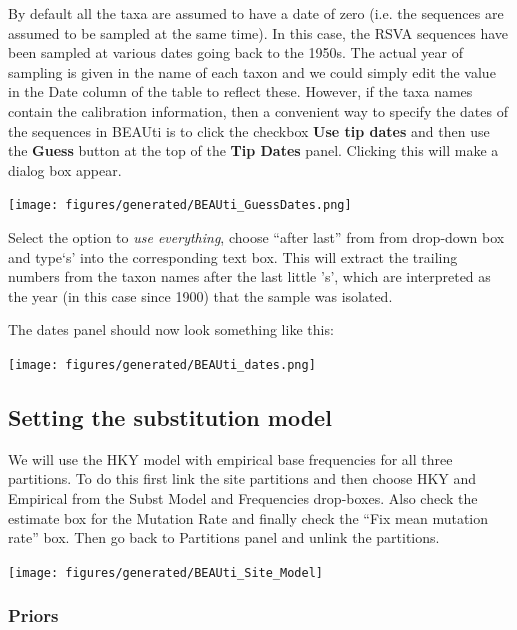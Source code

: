 \documentclass[12pt]{article}
\begin{document}
By default all the taxa are assumed to have a date of zero (i.e. the sequences are assumed to be sampled at the same time).
In this case, the RSVA sequences have been sampled at various dates going back to the 1950s. The actual year of sampling
is given in the name of each taxon and we could simply edit the value in the Date column of the table to reflect these.
However, if the taxa names contain the calibration information, then a convenient way to specify the dates of the sequences
in BEAUti is to click the checkbox {\bf Use tip dates} and then use the {\bf Guess} button at the top of the {\bf Tip Dates} panel. Clicking this will make a dialog box appear.

\medskip{}

\begin{center}
\texttt{[image: figures/generated/BEAUti\_GuessDates.png]}
\end{center}

\medskip{}

Select the option to {\it use everything}, choose ``after last'' from from drop-down box and type`s' into the corresponding text box. This will extract the trailing numbers from the taxon names after the last little 's', which are interpreted as the year (in this case since 1900) that the sample was isolated.

The dates panel should now look something like this:

\begin{center}
\texttt{[image: figures/generated/BEAUti\_dates.png]}
\end{center}


\subsection*{Setting the substitution model}
We will use the HKY model with empirical base frequencies for all three partitions. To do this first link the site partitions and then choose HKY and Empirical from the Subst Model and Frequencies drop-boxes. Also check the estimate box for the Mutation Rate and finally check the ``Fix mean mutation rate'' box. Then go back to Partitions panel and unlink the partitions.

\medskip{}

\texttt{[image: figures/generated/BEAUti\_Site\_Model]}

\medskip{}

\subsubsection{Priors }
\end{document}

